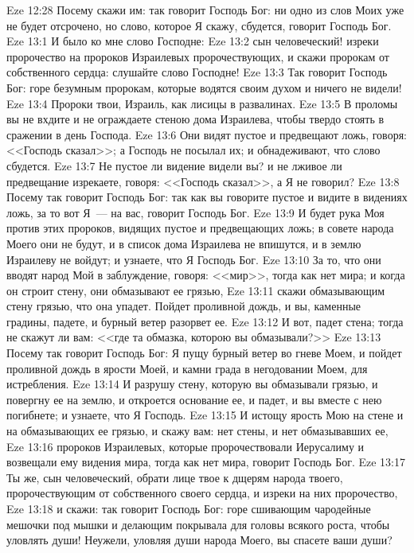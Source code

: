 \vs Eze 12:28 Посему скажи им: так говорит Господь Бог: ни одно из слов Моих уже не будет отсрочено, но слово, которое Я скажу, сбудется, говорит Господь Бог.
\vs Eze 13:1 И было ко мне слово Господне:
\vs Eze 13:2 сын человеческий! изреки пророчество на пророков Израилевых пророчествующих, и скажи пророкам от собственного сердца: слушайте слово Господне!
\vs Eze 13:3 Так говорит Господь Бог: горе безумным пророкам, которые водятся своим духом и ничего не видели!
\vs Eze 13:4 Пророки твои, Израиль, как лисицы в развалинах.
\vs Eze 13:5 В проломы вы не вхдите и не ограждаете стеною дома Израилева, чтобы твердо стоять в сражении в день Господа.
\vs Eze 13:6 Они видят пустое и предвещают ложь, говоря: <<Господь сказал>>; а Господь не посылал их; и обнадеживают, что слово сбудется.
\vs Eze 13:7 Не пустое ли видение видели вы? и не лживое ли предвещание изрекаете, говоря: <<Господь сказал>>, а Я не говорил?
\vs Eze 13:8 Посему так говорит Господь Бог: так как вы говорите пустое и видите в видениях ложь, за то вот Я~--- на вас, говорит Господь Бог.
\vs Eze 13:9 И будет рука Моя против этих пророков, видящих пустое и предвещающих ложь; в совете народа Моего они не будут, и в список дома Израилева не впишутся, и в землю Израилеву не войдут; и узнаете, что Я Господь Бог.
\vs Eze 13:10 За то, что они вводят народ Мой в заблуждение, говоря: <<мир>>, тогда как нет мира; и когда он строит стену, они обмазывают ее грязью,
\vs Eze 13:11 скажи обмазывающим стену грязью, что она упадет. Пойдет проливной дождь, и вы, каменные градины, падете, и бурный ветер разорвет ее.
\vs Eze 13:12 И вот, падет стена; тогда не скажут ли вам: <<где та обмазка, которою вы обмазывали?>>
\vs Eze 13:13 Посему так говорит Господь Бог: Я пущу бурный ветер во гневе Моем, и пойдет проливной дождь в ярости Моей, и камни града в негодовании Моем, для истребления.
\vs Eze 13:14 И разрушу стену, которую вы обмазывали грязью, и повергну ее на землю, и откроется основание ее, и падет, и вы вместе с нею погибнете; и узнаете, что Я Господь.
\vs Eze 13:15 И истощу ярость Мою на стене и на обмазывающих ее грязью, и скажу вам: нет стены, и нет обмазывавших ее,
\vs Eze 13:16 пророков Израилевых, которые пророчествовали Иерусалиму и возвещали ему видения мира, тогда как нет мира, говорит Господь Бог.
\vs Eze 13:17 Ты же, сын человеческий, обрати лице твое к дщерям народа твоего, пророчествующим от собственного своего сердца, и изреки на них пророчество,
\vs Eze 13:18 и скажи: так говорит Господь Бог: горе сшивающим чародейные мешочки под мышки и делающим покрывала для головы всякого роста, чтобы уловлять души! Неужели, уловляя души народа Моего, вы спасете ваши души?
